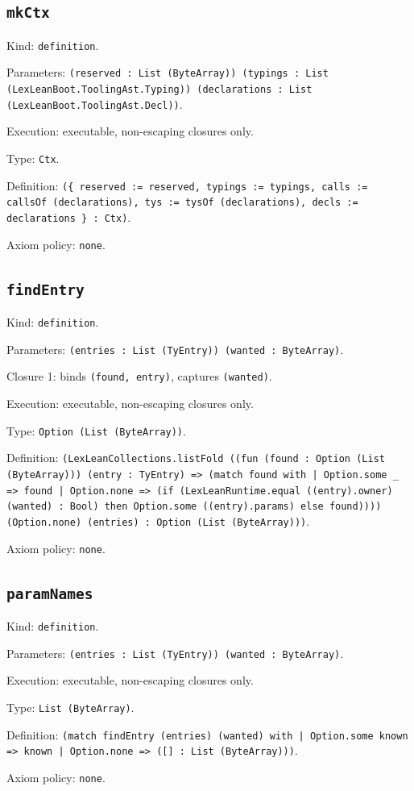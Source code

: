 \documentclass[11pt]{article}
\begin{document}
\subsection*{\texttt{mkCtx}}
\noindent Kind: \texttt{definition}.\par
\noindent Parameters: \texttt{(reserved : List (ByteArray)) (typings : List (LexLeanBoot.ToolingAst.Typing)) (declarations : List (LexLeanBoot.ToolingAst.Decl))}.\par
\noindent Execution: executable, non-escaping closures only.\par
\noindent Type: \texttt{Ctx}.\par
\noindent Definition: \texttt{(\{ reserved := reserved, typings := typings, calls := callsOf (declarations), tys := tysOf (declarations), decls := declarations \} : Ctx)}.\par
\noindent Axiom policy: \texttt{none}.\par
\subsection*{\texttt{findEntry}}
\noindent Kind: \texttt{definition}.\par
\noindent Parameters: \texttt{(entries : List (TyEntry)) (wanted : ByteArray)}.\par
\noindent Closure 1: binds \texttt{(found, entry)}, captures \texttt{(wanted)}.\par
\noindent Execution: executable, non-escaping closures only.\par
\noindent Type: \texttt{Option (List (ByteArray))}.\par
\noindent Definition: \texttt{(LexLeanCollections.listFold ((fun (found : Option (List (ByteArray))) (entry : TyEntry) => (match found with | Option.some \_ => found | Option.none => (if (LexLeanRuntime.equal ((entry).owner) (wanted) : Bool) then Option.some ((entry).params) else found)))) (Option.none) (entries) : Option (List (ByteArray)))}.\par
\noindent Axiom policy: \texttt{none}.\par
\subsection*{\texttt{paramNames}}
\noindent Kind: \texttt{definition}.\par
\noindent Parameters: \texttt{(entries : List (TyEntry)) (wanted : ByteArray)}.\par
\noindent Execution: executable, non-escaping closures only.\par
\noindent Type: \texttt{List (ByteArray)}.\par
\noindent Definition: \texttt{(match findEntry (entries) (wanted) with | Option.some known => known | Option.none => ([] : List (ByteArray)))}.\par
\noindent Axiom policy: \texttt{none}.\par
\end{document}
